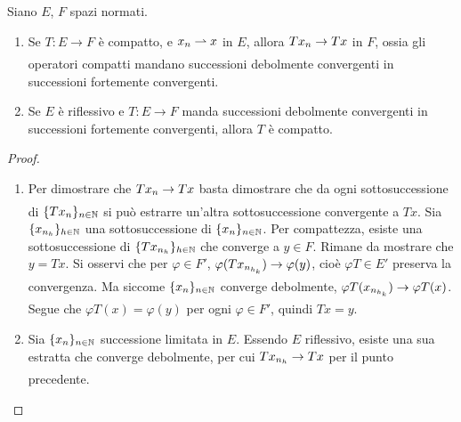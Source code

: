 \begin{theorem}
	Siano $E$, $F$ spazi normati.
	\begin{enumerate}
		\item Se $T:E \to F$ è compatto, e $x_n \rightharpoonup x$ in $E$, allora $Tx_n \underset{{}}{\rightarrow} Tx$ in $F$, ossia gli operatori compatti mandano successioni debolmente convergenti in successioni fortemente convergenti.
		\item Se $E$ è riflessivo e $T:E \to F$ manda successioni debolmente convergenti in successioni fortemente convergenti, allora $T$ è compatto.
	\end{enumerate}
\end{theorem}
\begin{proof}
	\leavevmode
	\begin{enumerate}
		\item Per dimostrare che $Tx_n \underset{{}}{\rightarrow} Tx$ basta dimostrare che da ogni sottosuccessione di $\{Tx_n\}_{n \in \mathbb{N}}$ si può estrarre un'altra sottosuccessione convergente a $Tx$.
		Sia $\{x_{n_h}\}_{h \in \mathbb{N}}$ una sottosuccessione di $\{x_n\}_{n \in \mathbb{N}}$. Per compattezza, esiste una sottosuccessione di $\{Tx_{n_h}\}_{h \in \mathbb{N}}$ che converge a $y \in F$. Rimane da mostrare che $y =Tx$. Si osservi che per $\varphi \in F'$, $\varphi(Tx_{n_{h_k}}) \underset{{}}{\rightarrow} \varphi(y)$, cioè $\varphi T \in E'$ preserva la convergenza. Ma siccome $\{x_n\}_{n \in \mathbb{N}}$ converge debolmente, $\varphi T(x_{n_{h_k}}) \underset{{}}{\rightarrow} \varphi T(x)$. Segue che $\varphi T(x) = \varphi(y)$ per ogni $\varphi \in F'$, quindi $Tx=y$.

		\item Sia $\{x_n\}_{n \in \mathbb{N}}$ successione limitata in $E$. Essendo $E$ riflessivo, esiste una sua estratta che converge debolmente, per cui $Tx_{n_h} \underset{{}}{\rightarrow} Tx$ per il punto precedente.
	\end{enumerate}
\end{proof}

